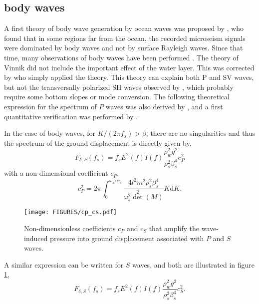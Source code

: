 \subsection{body waves}
A first theory  of body wave generation by ocean waves  was proposed by \cite{Vinnik1973}, who found that in some regions far from the ocean, the recorded microseism signals 
were dominated by body waves and not by surface Rayleigh waves. Since that time, many observations of body waves have been performed \citep[e.g.][]{Zhang&al.2010b,Obrebski&al.2013}. 
The theory of Vinnik did not include the important effect of the water layer. This was corrected by \cite{Ardhuin&Herbers2013} who simply applied the \cite{Hasselmann1963c} theory. 
This theory can explain both P and SV waves, but not the transversally polarized SH waves observed by \cite{Nishida&Takagi2016}, which probably require some bottom slopes or mode conversion. 
The following theoretical expression for the spectrum of $P$ waves was also derived by \cite{Gualtieri&al.2014}, and a first quantitative verification was performed by \cite{Farra&al.2016}. 


In the case of body waves, for $K/(2 \pi f_s) > \beta$, there are no singularities and thus the spectrum of the ground displacement is directly given by, 
\begin{equation}
F_{\delta,P}(f_s)= f_s   E^2(f)I(f)  \frac{\rho_w^2 g^2}{\rho_s^2 \beta_s^4 } c_P^2 
\label{eq:P_source}
\end{equation}
with a non-dimensional coefficient $c_{P}$,
\begin{equation}
 c_P^2=2 \pi \int_0^{\omega_s/\alpha_c} 
\frac{4 l^2 m^2 \rho_s^2 \beta_s^4}{\omega_s^2 \det^2 (M)} K {\mathrm d} K \label{c_P_def}.
\end{equation}


\begin{figure}[htb]
\centerline{\texttt{[image: FIGURES/cp\_cs.pdf]}}
  \caption{Non-dimensionless coefficients  $c_P$ and $c_S$ that amplify the wave-induced pressure into ground displacement
associated with $P$ and $S$ waves.}
\label{fig:sismo_coefPS}
\end{figure}
A similar expression can be written for $S$ waves, and both are illustrated in 
figure  \ref{fig:sismo_coefPS}, 
\begin{equation}
F_{\delta,S}(f_s)= f_s   E^2(f)I(f)   \frac{\rho_w^2 g^2  }{\rho_s^2 \beta_s^4 } c_S^2.
\label{eq:S_source}
\end{equation}

